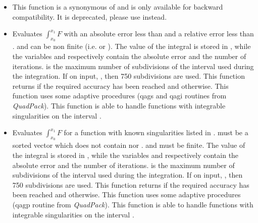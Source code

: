\begin{itemize}
\item {}
  \sshortdescribe This function is a synonymous of
   and is only available for backward
  compatibility. It is deprecated, please use 
  instead.

\item {}
  \sshortdescribe Evaluates $\int_{x_0}^{x_1} F$ with an absolute error less
  than  and a relative error less than .  and
   can be non finite (i.e.  or ). The
  value of the integral is stored in , while the variables
   and  respectively contain the absolute error and the
  number of iterations.  is the maximum number of subdivisions of the
  interval  used during the integration. If on input, , then 750 subdivisions are used.  This function returns  if the
  required accuracy has been reached and  otherwise. This function
  uses some adaptive procedures (qags and qagi routines from {\it QuadPack}).
  This function is able to handle functions  with integrable
  singularities on the interval \var{[x0,x1]}.

\item {}
  \sshortdescribe Evaluates $\int_{x_0}^{x_1} F$  for a function
   with known singularities listed in .
   must be a sorted vector which does not contain 
  nor .   and  must be  finite. The value of the
  integral is stored in , while the variables  and
   respectively contain the absolute error and the number of
  iterations.  is the maximum number of subdivisions of the interval
   used during the integration. If on input, , then
  750 subdivisions are used.  This function returns  if the required
  accuracy has been reached and  otherwise. This function uses some
  adaptive procedures (qagp routine from {\it QuadPack}).  This function is
  able to handle functions  with integrable singularities on the interval
  \var{[x0,x1]}.
\end{itemize}


